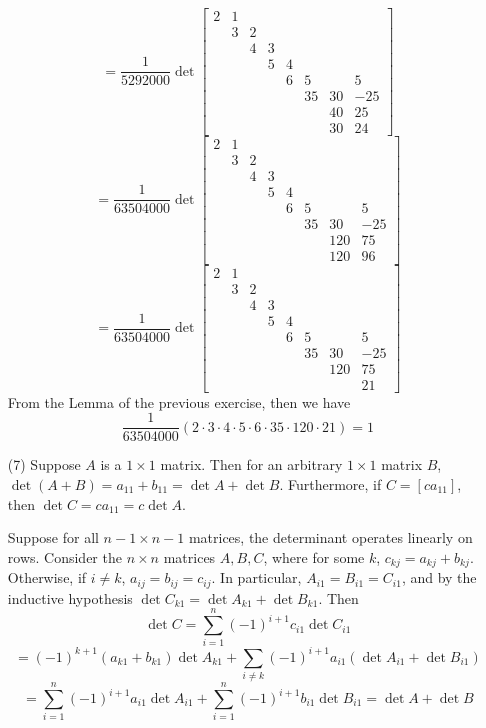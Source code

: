 \begin{itemize}
$$= \frac{1}{5292000}\det\begin{bmatrix}
2 & 1 \\
& 3 & 2 \\
& & 4 & 3 \\
& & & 5 & 4 \\
& & & & 6 & 5 & & 5\\
& & & & & 35 & 30 & -25\\
& & & & & & 40 & 25\\
& & & & & & 30 & 24
\end{bmatrix}$$
$$= \frac{1}{63504000}\det\begin{bmatrix}
2 & 1 \\
& 3 & 2 \\
& & 4 & 3 \\
& & & 5 & 4 \\
& & & & 6 & 5 & & 5\\
& & & & & 35 & 30 & -25\\
& & & & & & 120 & 75\\
& & & & & & 120 & 96
\end{bmatrix}$$
$$= \frac{1}{63504000}\det\begin{bmatrix}
2 & 1 \\
& 3 & 2 \\
& & 4 & 3 \\
& & & 5 & 4 \\
& & & & 6 & 5 & & 5\\
& & & & & 35 & 30 & -25\\
& & & & & & 120 & 75\\
& & & & & & & 21
\end{bmatrix}$$
From the Lemma of the previous exercise, then we have
$$\frac{1}{63504000}(2\cdot 3 \cdot 4 \cdot 5 \cdot 6 \cdot 35 \cdot 120 \cdot 21) = 1$$
\item[(7)]
Suppose $A$ is a $1 \times 1$ matrix. Then for an arbitrary $1 \times 1$ matrix $B$, $\det(A + B) = a_{11} + b_{11} = \det A + \det B$. Furthermore, if $C = [ca_{11}]$, then $\det C = ca_{11} = c\det A$.

Suppose for all $n - 1 \times n - 1$ matrices, the determinant operates linearly on rows. Consider the $n \times n$ matrices $A, B, C$, where for some $k$, $c_{kj} = a_{kj} + b_{kj}$. Otherwise, if $i \neq k$, $a_{ij} = b_{ij} = c_{ij}$. In particular, $A_{i1} = B_{i1} = C_{i1}$, and by the inductive hypothesis $\det C_{k1} = \det A_{k1} + \det B_{k1}$. Then
$$\det C = \sum_{i=1}^n (-1)^{i+1}c_{i1}\det C_{i1}$$
$$= (-1)^{k+1}(a_{k1} + b_{k1})\det A_{k1} + \sum_{i \neq k}(-1)^{i+1}a_{i1}(\det A_{i1} + \det B_{i1})$$
$$= \sum_{i=1}^n (-1)^{i+1}a_{i1}\det A_{i1} + \sum_{i=1}^n (-1)^{i+1} b_{i1} \det B_{i1} = \det A + \det B$$


\end{itemize}
